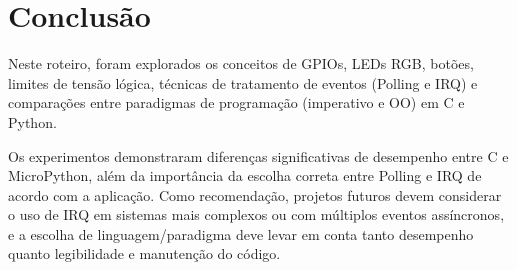 \documentclass{article}
\begin{document}
\section{Conclusão}
Neste roteiro, foram explorados os conceitos de GPIOs, LEDs RGB, botões, limites de tensão lógica, técnicas de tratamento de eventos (Polling e IRQ) e comparações entre paradigmas de programação (imperativo e OO) em C e Python.  

Os experimentos demonstraram diferenças significativas de desempenho entre C e MicroPython, além da importância da escolha correta entre Polling e IRQ de acordo com a aplicação. Como recomendação, projetos futuros devem considerar o uso de IRQ em sistemas mais complexos ou com múltiplos eventos assíncronos, e a escolha de linguagem/paradigma deve levar em conta tanto desempenho quanto legibilidade e manutenção do código.  
\end{document}
